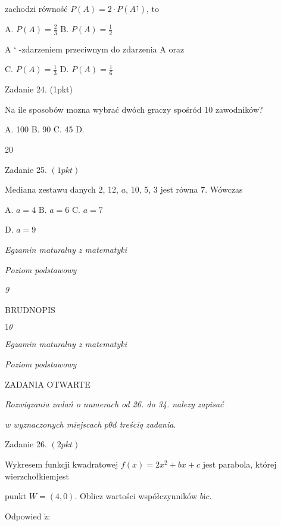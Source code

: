 \documentclass[a4paper,12pt]{article}
\begin{document}
zachodzi równość $P(A)=2\cdot P(A^{\uparrow})$, to

A. $P(A)=\displaystyle \frac{2}{3}$ B. $P(A)=\displaystyle \frac{1}{2}$

A ` -zdarzeniem przeciwnym do zdarzenia A oraz

C. $P(A)=\displaystyle \frac{1}{3}$ D. $P(A)=\displaystyle \frac{1}{6}$

Zadanie 24. (1pkt)

Na ile sposobów mozna wybrać dwóch graczy spośród 10 zawodników?

A. 100 B. 90 C. 45 D.

20

Zadanie 25. $(1pkt)$

Mediana zestawu danych 2, 12, $a$, 10, 5, 3 jest równa 7. Wówczas

A. $a=4$ B. $a=6$ C. $a=7$

D. $a=9$





{\it Egzamin maturalny z matematyki}

{\it Poziom podstawowy}

{\it 9}

BRUDNOPIS





$ 1\theta$

{\it Egzamin maturalny z matematyki}

{\it Poziom podstawowy}

ZADANIA OTWARTE

{\it Rozwiqzania zadań o numerach od 26. do 34. nalezy zapisać}

{\it w wyznaczonych miejscach} $p\theta d$ {\it treściq zadania}.

Zadanie 26. $(2pkt)$

Wykresem funkcji kwadratowej $f(x)=2x^{2}+bx+c$ jest parabola, której wierzchołkiemjest

punkt $W=(4,0)$. Oblicz wartości współczynników $b\mathrm{i}c.$

Odpowied $\acute{\mathrm{z}}$:
\end{document}
